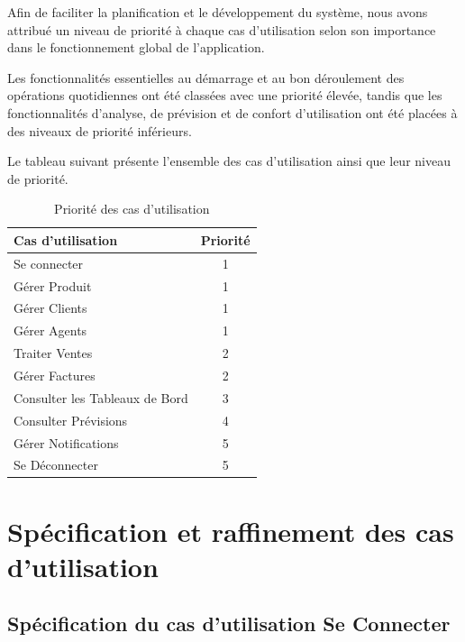 Afin de faciliter la planification et le développement du système, nous avons attribué un niveau de priorité à chaque cas d'utilisation selon son importance dans le fonctionnement global de l'application.

Les fonctionnalités essentielles au démarrage et au bon déroulement des opérations quotidiennes ont été classées avec une priorité élevée, tandis que les fonctionnalités d'analyse, de prévision et de confort d'utilisation ont été placées à des niveaux de priorité inférieurs.

Le tableau suivant présente l'ensemble des cas d'utilisation ainsi que leur niveau de priorité.

\begin{table}[H]
\centering

\renewcommand{\arraystretch}{1.2}



\begin{tabular}{|p{9cm}|c|}
\hline
\rowcolor{purple!25}
\textbf{Cas d'utilisation} & \textbf{Priorité} \\
\hline
Se connecter & 1 \\
\hline
Gérer Produit & 1 \\
\hline
Gérer Clients & 1 \\
\hline
Gérer Agents & 1 \\
\hline
Traiter Ventes & 2 \\
\hline
Gérer Factures & 2 \\
\hline
Consulter les Tableaux de Bord & 3 \\
\hline
Consulter Prévisions & 4 \\
\hline
Gérer Notifications & 5 \\
\hline
Se Déconnecter & 5 \\
\hline
\end{tabular}

\caption{Priorité des cas d'utilisation}

\end{table}

\newpage
\section{Spécification et raffinement des cas d'utilisation}

\subsection{Spécification du cas d'utilisation Se Connecter}

